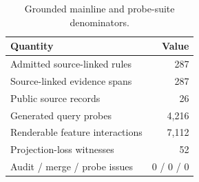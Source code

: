 \begin{table}[t]
\centering
\caption{Grounded mainline and probe-suite denominators.}
\label{tab:mainline}
\small
\begin{tabular}{lr}
\toprule
Quantity & Value \\
\midrule
Admitted source-linked rules & 287 \\
Source-linked evidence spans & 287 \\
Public source records & 26 \\
Generated query probes & 4,216 \\
Renderable feature interactions & 7,112 \\
Projection-loss witnesses & 52 \\
Audit / merge / probe issues & 0 / 0 / 0 \\
\bottomrule
\end{tabular}
\end{table}
